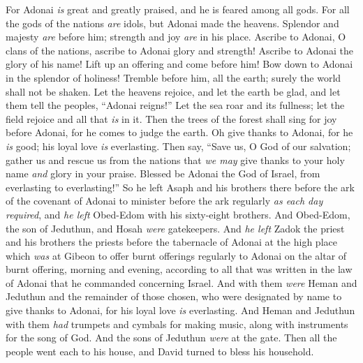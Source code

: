 \begin{biblechapter}
\verse For Adonai \textit{is} great and greatly praised, 
and he is feared among all gods.
\verse For all the gods of the nations \textit{are} idols, 
but Adonai made the heavens.
\verse Splendor and majesty \textit{are} before him; 
strength and joy \textit{are} in his place.
\verse Ascribe to Adonai, O clans of the nations, 
ascribe to Adonai glory and strength!
\verse Ascribe to Adonai the glory of his name! 
Lift up an offering and come before him! 
Bow down to Adonai in the splendor of holiness!
\verse Tremble before him, all the earth; 
surely the world shall not be shaken.
\verse Let the heavens rejoice, and let the earth be glad, 
and let them tell the peoples, “Adonai reigns!”
\verse Let the sea roar and its fullness; 
let the field rejoice and all that \textit{is} in it.
\verse Then the trees of the forest shall sing for joy before Adonai, 
for he comes to judge the earth.
\verse Oh give thanks to Adonai, for he \textit{is} good; 
his loyal love \textit{is} everlasting.
\verse Then say, “Save us, O God of our salvation; 
gather us and rescue us from the nations 
that \textit{we may} give thanks to your holy name 
\textit{and} glory in your praise.
\verse Blessed be Adonai the God of Israel, 
from everlasting to everlasting!”
 So he left Asaph and his brothers there before the ark of the covenant of Adonai to minister before the ark regularly \textit{as each day required},
\verse and \textit{he left} Obed-Edom with his sixty-eight brothers. And Obed-Edom, the son of Jeduthun, and Hosah \textit{were} gatekeepers.
\verse And \textit{he left} Zadok the priest and his brothers the priests before the tabernacle of Adonai at the high place which \textit{was} at Gibeon
\verse to offer burnt offerings regularly to Adonai on the altar of burnt offering, morning and evening, according to all that was written in the law of Adonai that he commanded concerning Israel.
\verse And with them \textit{were} Heman and Jeduthun and the remainder of those chosen, who were designated by name to give thanks to Adonai, for his loyal love \textit{is} everlasting.
\verse And Heman and Jeduthun with them \textit{had} trumpets and cymbals for making music, along with instruments for the song of God. And the sons of Jeduthun \textit{were} at the gate.
\verse Then all the people went each to his house, and David turned to bless his household.
\end{biblechapter}

